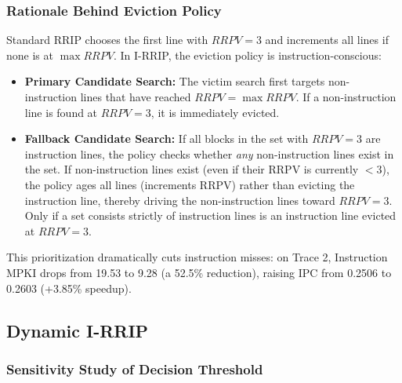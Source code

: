 \documentclass[a4paper, 11pt]{article}
\begin{document}
\subsubsection{Rationale Behind Eviction Policy}
Standard RRIP chooses the first line with $RRPV = 3$ and increments all lines if none is at $\max RRPV$. In I-RRIP, the eviction policy is instruction-conscious:
\begin{itemize}
    \item \textbf{Primary Candidate Search:} The victim search first targets non-instruction lines that have reached $RRPV = \max RRPV$. If a non-instruction line is found at $RRPV = 3$, it is immediately evicted.
    \item \textbf{Fallback Candidate Search:} If all blocks in the set with $RRPV = 3$ are instruction lines, the policy checks whether \emph{any} non-instruction lines exist in the set. If non-instruction lines exist (even if their RRPV is currently $< 3$), the policy ages all lines (increments RRPV) rather than evicting the instruction line, thereby driving the non-instruction lines toward $RRPV = 3$. Only if a set consists strictly of instruction lines is an instruction line evicted at $RRPV = 3$.
\end{itemize}
This prioritization dramatically cuts instruction misses: on Trace 2, Instruction MPKI drops from 19.53 to 9.28 (a 52.5\% reduction), raising IPC from 0.2506 to 0.2603 (+3.85\% speedup).

\subsection{Dynamic I-RRIP}
\label{sec:dyn-irrip}
\subsubsection{Sensitivity Study of Decision Threshold}
\end{document}
